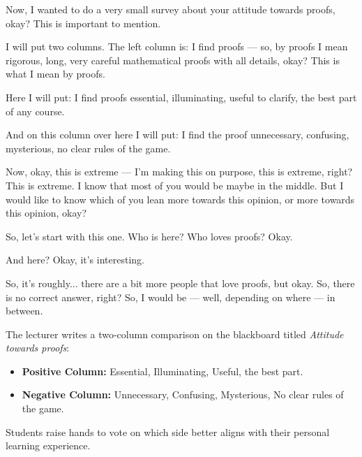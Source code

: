\begin{spoken-clean}[00:23:23 - 00:26:22]
Now, I wanted to do a very small survey about your attitude towards proofs, okay? This is important to mention.

I will put two columns. The left column is: I find proofs --- so, by proofs I mean rigorous, long, very careful mathematical proofs with all details, okay? This is what I mean by proofs.

Here I will put: I find proofs essential, illuminating, useful to clarify, the best part of any course.

And on this column over here I will put: I find the proof unnecessary, confusing, mysterious, no clear rules of the game.

Now, okay, this is extreme --- I'm making this on purpose, this is extreme, right? This is extreme. I know that most of you would be maybe in the middle. But I would like to know which of you lean more towards this opinion, or more towards this opinion, okay?

So, let's start with this one. Who is here? Who loves proofs? Okay.

And here? Okay, it's interesting.

So, it's roughly... there are a bit more people that love proofs, but okay. So, there is no correct answer, right? So, I would be --- well, depending on where --- in between.
\end{spoken-clean}

\begin{meta-note}
The lecturer writes a two-column comparison on the blackboard titled \emph{Attitude towards proofs}:
\begin{itemize}
    \item \textbf{Positive Column:} Essential, Illuminating, Useful, the best part.
    \item \textbf{Negative Column:} Unnecessary, Confusing, Mysterious, No clear rules of the game.
\end{itemize}
Students raise hands to vote on which side better aligns with their personal learning experience.
\end{meta-note}

